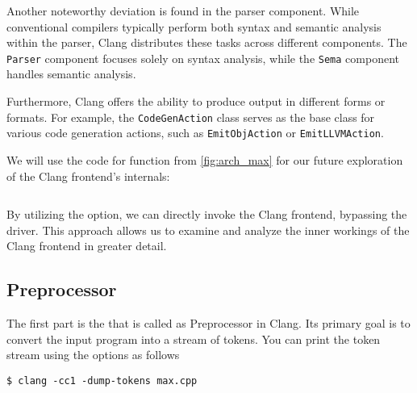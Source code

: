 Another noteworthy deviation is found in the parser component. While
conventional compilers typically perform both syntax and semantic analysis
within the parser, Clang distributes these tasks across different
components. The \texttt{Parser} component focuses solely on syntax
analysis, while the \texttt{Sema} component handles semantic analysis. 

Furthermore, Clang offers the ability to produce output in different forms or
formats. For example, the \texttt{CodeGenAction} class serves as the
base class for various code generation actions, such as
\texttt{EmitObjAction} or \texttt{EmitLLVMAction}. 

We will use the code for  function from \cref{fig:arch_max} for our future exploration of the Clang frontend's internals:
\inputminted{c++}{./src/part1/ch2_arch/max.cpp}
By utilizing the  option, we can directly invoke the Clang frontend,
bypassing the driver. This approach allows us to examine and analyze the inner
workings of the Clang frontend in greater detail. 

\subsection{Preprocessor}

The first part is the \lexer that is called as Preprocessor in Clang.  Its
primary goal is to convert the input program into a stream of tokens. You can
print the token stream using the  options as follows 
\begin{adjustwidth}{0em}{0em}
\begin{verbatim}
$ clang -cc1 -dump-tokens max.cpp
\end{verbatim}
\end{adjustwidth}

